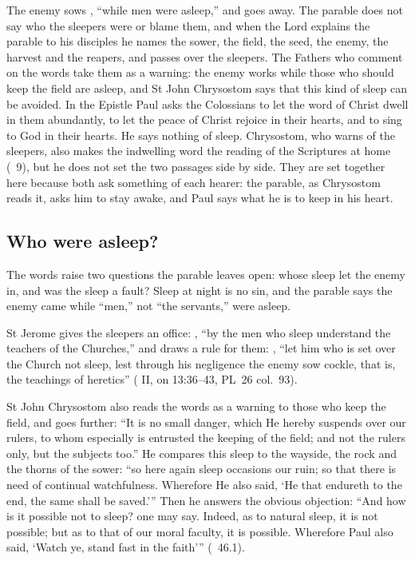 
The enemy sows , ``while men were asleep,'' and
goes away. The parable does not say who the sleepers were or blame them, and
when the Lord explains the parable to his disciples he names the sower, the
field, the seed, the enemy, the harvest and the reapers, and passes over the
sleepers. The Fathers who comment on the words take them as a warning: the
enemy works while those who should keep the field are asleep, and St John
Chrysostom says that this kind of sleep can be avoided. In the Epistle Paul
asks the Colossians to let the word of Christ dwell in them abundantly, to let the peace of Christ
rejoice in their hearts, and to sing to God in their hearts. He says nothing
of sleep. Chrysostom, who warns of the sleepers, also makes the indwelling
word the reading of the Scriptures at home (\ 9), but he
does not set the two passages side by side. They are set together here
because both ask something of each hearer: the parable, as Chrysostom reads
it, asks him to stay awake, and Paul says what he is to keep in his heart.

\subsection{Who were asleep?}
\label{sec:heart-sleepers}

The words raise two questions the parable leaves open: whose sleep let the
enemy in, and was the sleep a fault? Sleep at night is no sin, and the
parable says the enemy came while ``men,'' not ``the servants,'' were asleep.

St Jerome gives the sleepers an office: , ``by the men who sleep understand the
teachers of the Churches,'' and draws a rule for them: , ``let him who is set
over the Church not sleep, lest through his negligence the enemy sow cockle,
that is, the teachings of heretics'' ( II, on 13:36--43,
PL~26 col.~93).

St John Chrysostom also reads the words as a warning to those who keep the
field, and goes further: ``It is no small
danger, which He hereby suspends over our rulers, to whom especially is
entrusted the keeping of the field; and not the rulers only, but the subjects
too.'' He compares this sleep to the wayside, the rock and the thorns of the
sower: ``so here again sleep occasions our ruin; so that there is need of
continual watchfulness. Wherefore He also said, `He that endureth to the end,
the same shall be saved.''' Then he answers the obvious objection: ``And how
is it possible not to sleep? one may say. Indeed, as to natural sleep, it is
not possible; but as to that of our moral faculty, it is possible. Wherefore
Paul also said, `Watch ye, stand fast in the faith''' (\
46.1).

